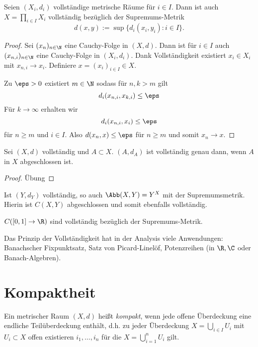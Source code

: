 \begin{st}
	Seien $(X_i,d_i)$ vollständige metrische Räume für $i \in I$.
	Dann ist auch $X = \prod_{i\in I} X_i$ vollständig bezüglich der Supremums-Metrik
	\[
		d(x,y) := \sup \{ d_i(x_i, y_i) : i \in I \}.
	\]
	\begin{proof}
		Sei $(x_n)_{n\in \N}$ eine Cauchy-Folge in $(X,d)$.
		Dann ist für $i \in I$ auch $(x_{n,i})_{n\in \N}$ eine Cauchy-Folge in $(X_i,d_i)$.
		Dank Vollständigkeit existiert $x_i \in X_i$ mit $x_{n,i} \to x_i$.
		Definiere $ x= (x_i)_{i\in I} \in X$.

		Zu  $\eps > 0$ existiert $m \in \N$ sodass für $n,k > m$ gilt
		\[
			d_i(x_{n,i}, x_{k,i}) \le \eps
		\]
		Für $k \to \infty$ erhalten wir
		\[
			d_i(x_{n,i},x_i) \le \eps
		\]
		für $n \ge m$ und $i \in I$.
		Also $d(x_n, x) \le \eps$ für $n \ge m$ und somit $x_n \to x$.
	\end{proof}
\end{st}

\begin{lem}
	Sei $(X,d)$ vollständig und $A \subset X$.
	$(A,d_A)$ ist vollständig genau dann, wenn $A$ in $X$ abgeschlossen ist.
	\begin{proof}
		Übung
	\end{proof}
\end{lem}

\begin{st}
	Ist $(Y,d_Y)$ vollständig, so auch $\Abb(X,Y) = Y^X$ mit der Supremumsmetrik.
	Hierin ist $C(X,Y)$ abgeschlossen und somit ebenfalls vollständig.
\end{st}

\begin{ex}
	$C([0,1] \to \R)$ sind vollständig bezüglich der Supremums-Metrik.
\end{ex}

Das Prinzip der Vollständigkeit hat in der Analysis viele Anwendungen: Banachscher Fixpunktsatz, Satz von Picard-Linelöf, Potenzreihen (in $\R, \C$ oder Banach-Algebren).


\section{Kompaktheit}


\begin{df}
	Ein metrischer Raum $(X,d)$ heißt \emph{kompakt}, wenn jede offene Überdeckung eine endliche Teilüberdeckung enthält, d.h. zu jeder Überdeckung $X = \bigcup_{i \in I} U_i$ mit $U_i \subset X$ offen existieren $i_1, \dotsc, i_n$ für die $X = \bigcup_{i=1}^n U_i$ gilt.
\end{df}

